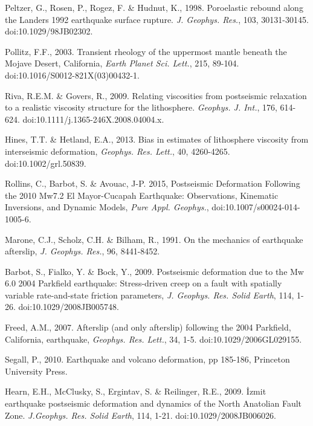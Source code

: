 \documentclass[fleqn,12pt]{article}
\begin{document}
\begin{thebibliography}{}
 Peltzer, G., Rosen, P.,
  Rogez, F. \& Hudnut, K., 1998. Poroelastic rebound along the Landers
  1992 earthquake surface rupture. \textit{J. Geophys. Res.}, 103,
  30131-30145. doi:10.1029/98JB02302.

 Pollitz, F.F., 2003. Transient
  rheology of the uppermost mantle beneath the Mojave Desert,
  California, \textit{Earth Planet Sci. Lett.}, 215,
  89-104. doi:10.1016/S0012-821X(03)00432-1.

 Riva, R.E.M. \&
  Govers, R., 2009. Relating viscosities from postseismic relaxation
  to a realistic viscosity structure for the
  lithosphere. \textit{Geophys. J.  Int.}, 176,
  614-624. doi:10.1111/j.1365-246X.2008.04004.x.

 Hines, T.T. \&
  Hetland, E.A., 2013. Bias in estimates of lithosphere viscosity from
  interseismic deformation, \textit{Geophys. Res. Lett.}, 40,
  4260-4265. doi:10.1002/grl.50839.

 Rollins, C., Barbot,
  S. \& Avouac, J-P. 2015, Postseismic Deformation Following the 2010
  Mw7.2 El Mayor-Cucapah Earthquake: Observations, Kinematic
  Inversions, and Dynamic Models, \textit{Pure Appl. Geophys.},
  doi:10.1007/s00024-014-1005-6.

 Marone, C.J., Scholz,
  C.H.  \& Bilham, R., 1991. On the mechanics of earthquake
  afterslip, \textit{J. Geophys. Res.}, 96, 8441-8452.

 Barbot, S., Fialko, Y. \& Bock,
  Y., 2009. Postseismic deformation due to the Mw 6.0 2004 Parkfield
  earthquake: Stress-driven creep on a fault with spatially variable
  rate-and-state friction parameters, \textit{J. Geophys. Res. Solid
  Earth}, 114, 1-26. doi:10.1029/2008JB005748.

 Freed, A.M., 2007. Afterslip
  (and only afterslip) following the 2004 Parkfield, California,
  earthquake, \textit{Geophys. Res. Lett.}, 34,
  1-5. doi:10.1029/2006GL029155.

 Segall, P., 2010. Earthquake and
  volcano deformation, pp 185-186, Princeton University Press.

 Hearn, E.H., McClusky,
  S., Ergintav, S. \& Reilinger, R.E., 2009. \.Izmit earthquake
  postseismic deformation and dynamics of the North Anatolian Fault
  Zone. \textit{J.Geophys. Res. Solid Earth}, 114,
  1-21. doi:10.1029/2008JB006026.


\end{thebibliography}
\end{document}
